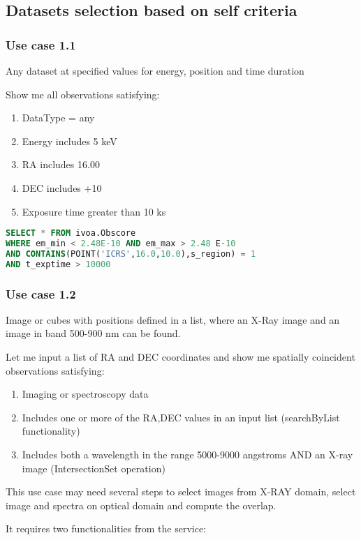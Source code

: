\documentclass[11pt,a4paper]{ivoa}
\begin{document}
\subsection{Datasets selection based on self criteria}
\subsubsection{Use case 1.1}
Any dataset at specified values for energy, position and time duration 

Show me all observations satisfying:

\begin{enumerate}
\item DataType = any
\item Energy includes 5 keV
\item RA includes 16.00
\item DEC includes +10
\item Exposure time greater than 10 ks
\end{enumerate}

\begin{lstlisting}[language=SQL,flexiblecolumns=true]
SELECT * FROM ivoa.Obscore
WHERE em_min < 2.48E-10 AND em_max > 2.48 E-10
AND CONTAINS(POINT('ICRS',16.0,10.0),s_region) = 1
AND t_exptime > 10000
\end{lstlisting}

\subsubsection{Use case 1.2}
Image or cubes with positions defined in a list, where an X-Ray image and an image in band 500-900 nm can be found.

Let me input a list of RA and DEC coordinates and show me spatially coincident observations satisfying:

\begin{enumerate}
\item Imaging or spectroscopy data
\item Includes one or more of the RA,DEC values in an input list (searchByList functionality)
\item Includes both a wavelength in the range 5000-9000 angstroms AND an X-ray image (IntersectionSet operation)
\end{enumerate}
This use case may need several steps to select images from X-RAY domain, select image and spectra on optical domain and
compute the overlap.

It requires two functionalities from the service: 
\end{document}
